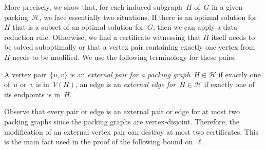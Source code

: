 \documentclass[envcountsame,numbook,smallextended]{svjour3}
\numberwithin{equation}{section}
\numberwithin{figure}{section}
\newcommand{\packing}{\ensuremath{\mathcal H}}
\begin{document}
More precisely, we show that, for each induced
subgraph~\(H\) of~\(G\) in a given packing~\(\packing\), we face
essentially two situations. If there is an optimal solution for~$H$
that is a subset of an optimal solution for~\(G\), then we can apply a data reduction rule. Otherwise, we find a
certificate witnessing that $H$ itself needs to be solved
suboptimally or that a vertex pair containing exactly
one vertex from~$H$ needs to be modified. We use the following terminology for these pairs. 
\begin{definition}A vertex pair~$\{u,v\}$ is an \emph{external pair for a packing graph~$H\in \packing$} if exactly one of~$u$ or~$v$
  is in~$V(H)$, an edge is an \emph{external edge for~$H\in \packing$} if exactly one of its endpoints
  is in~$H$. 
\end{definition}
Observe that every pair or edge is an external pair or edge for at most two packing graphs
since the packing graphs are vertex-disjoint. Therefore, the modification of an external vertex
pair can destroy at most two certificates.
This is the main fact used in the proof of the
following bound on~$\ell$.
\end{document}
